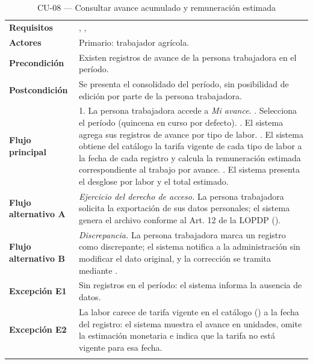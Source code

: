 \begin{longtable}{|L{3.4cm}|L{12.0cm}|}
\hline
{}\\
\hline
\textbf{Requisitos} & , ,  \\ \hline
\textbf{Actores} & Primario: trabajador agrícola. \\ \hline
\textbf{Precondición} & Existen registros de avance de la persona trabajadora en el período. \\ \hline
\textbf{Postcondición} & Se presenta el consolidado del período, sin posibilidad de edición por parte de la persona trabajadora. \\ \hline
\textbf{Flujo principal} & 1. La persona trabajadora accede a \emph{Mi avance}. . Selecciona el período (quincena en curso por defecto). . El sistema agrega sus registros de avance por tipo de labor. . El sistema obtiene del catálogo la tarifa vigente de cada tipo de labor a la fecha de cada registro y calcula la remuneración estimada correspondiente al trabajo por avance. . El sistema presenta el desglose por labor y el total estimado. \\ \hline
\textbf{Flujo alternativo A} & \emph{Ejercicio del derecho de acceso.} La persona trabajadora solicita la exportación de sus datos personales; el sistema genera el archivo conforme al Art. 12 de la LOPDP (). \\ \hline
\textbf{Flujo alternativo B} & \emph{Discrepancia.} La persona trabajadora marca un registro como discrepante; el sistema notifica a la administración sin modificar el dato original, y la corrección se tramita mediante . \\ \hline
\textbf{Excepción E1} & Sin registros en el período: el sistema informa la ausencia de datos. \\ \hline
\textbf{Excepción E2} & La labor carece de tarifa vigente en el catálogo () a la fecha del registro: el sistema muestra el avance en unidades, omite la estimación monetaria e indica que la tarifa no está vigente para esa fecha. \\ \hline
\caption{CU-08 --- Consultar avance acumulado y remuneración estimada}
\end{longtable}


